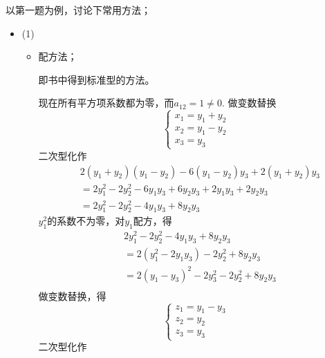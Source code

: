 \documentclass{article}
\begin{document}
以第一题为例，讨论下常用方法；
\begin{itemize}
  \item (1)

        \begin{itemize}
          \item 配方法；

                即书中得到标准型的方法。

                现在所有平方项系数都为零，而$a_{12} = 1 \neq 0$.
                做变数替换
                \begin{equation*}
                  \begin{cases*}
                    x_1 = y_1 + y_2 \\
                    x_2 = y_1 - y_2 \\
                    x_3 = y_3
                  \end{cases*}
                \end{equation*}
                二次型化作
                \begin{align*}
                   & 2(y_1 + y_2)(y_1 - y_2) - 6(y_1 - y_2) y_3 + 2(y_1 + y_2) y_3       \\
                   & = 2 y_1^2 - 2 y_2^2 - 6 y_1 y_3 + 6 y_2 y_3 + 2 y_1 y_3 + 2 y_2 y_3 \\
                   & = 2 y_1^2 - 2 y_2^2 - 4 y_1 y_3 + 8 y_2 y_3
                \end{align*}
                $y_1^2$的系数不为零，对$y_1$配方，得
                \begin{align*}
                   & 2 y_1^2 - 2 y_2^2 - 4 y_1 y_3 + 8 y_2 y_3         \\
                   & = 2 (y_1 ^2 - 2 y_1 y_3) - 2 y_2^2 + 8 y_2 y_3    \\
                   & = 2 (y_1 - y_3)^2 - 2 y_3^2 - 2 y_2^2 + 8 y_2 y_3 \\
                \end{align*}
                做变数替换，得
                \begin{equation*}
                  \begin{cases*}
                    z_1 = y_1 - y_3 \\
                    z_2 = y_2       \\
                    z_3 = y_3
                  \end{cases*}
                \end{equation*}
                二次型化作
                \begin{align*}

\end{align*}
\end{itemize}
\end{itemize}
\end{document}
